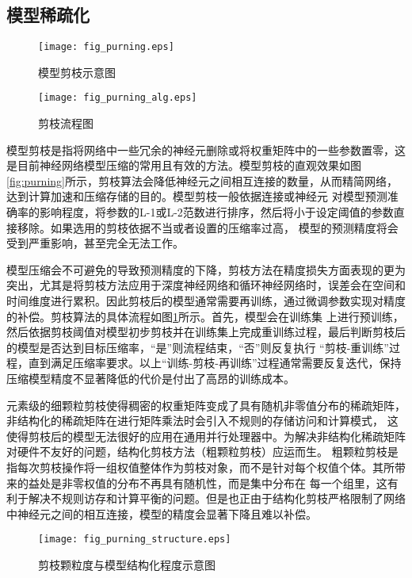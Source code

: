 \subsection{模型稀疏化}

\begin{figure}
	\centering
	\begin{minipage}[t]{0.48\textwidth}
		\centering
		\texttt{[image: fig\_purning.eps]}
		\caption{模型剪枝示意图}
		\label{fig:purning}
	\end{minipage}
	\begin{minipage}[t]{0.48\textwidth}
		\centering
		\texttt{[image: fig\_purning\_alg.eps]}
		\caption{剪枝流程图}
		\label{fig:purning_alg}
	\end{minipage}
\end{figure}
模型剪枝是指将网络中一些冗余的神经元删除或将权重矩阵中的一些参数置零，这是目前神经网络模型压缩的常用且有效的方法。模型剪枝的直观效果如图
\ref{fig:purning}所示，剪枝算法会降低神经元之间相互连接的数量，从而精简网络，达到计算加速和压缩存储的目的。模型剪枝一般依据连接或神经元
对模型预测准确率的影响程度，将参数的L-1或L-2范数进行排序，然后将小于设定阈值的参数直接移除。如果选用的剪枝依据不当或者设置的压缩率过高，
模型的预测精度将会受到严重影响，甚至完全无法工作。

模型压缩会不可避免的导致预测精度的下降，剪枝方法在精度损失方面表现的更为突出，尤其是将剪枝方法应用于深度神经网络和循环神经网络时，误差会在空间和
时间维度进行累积。因此剪枝后的模型通常需要再训练，通过微调参数实现对精度的补偿。剪枝算法的具体流程如图\ref{fig:purning_alg}所示。首先，模型会在训练集
上进行预训练，然后依据剪枝阈值对模型初步剪枝并在训练集上完成重训练过程，最后判断剪枝后的模型是否达到目标压缩率，“是”则流程结束，“否”则反复执行
“剪枝-重训练”过程，直到满足压缩率要求。以上“训练-剪枝-再训练”过程通常需要反复迭代，保持压缩模型精度不显著降低的代价是付出了高昂的训练成本。

元素级的细颗粒剪枝使得稠密的权重矩阵变成了具有随机非零值分布的稀疏矩阵，非结构化的稀疏矩阵在进行矩阵乘法时会引入不规则的存储访问和计算模式，
这使得剪枝后的模型无法很好的应用在通用并行处理器中。为解决非结构化稀疏矩阵对硬件不友好的问题，结构化剪枝方法（粗颗粒剪枝）应运而生。
粗颗粒剪枝是指每次剪枝操作将一组权值整体作为剪枝对象，而不是针对每个权值个体。其所带来的益处是非零权值的分布不再具有随机性，而是集中分布在
每一个组里，这有利于解决不规则访存和计算平衡的问题。但是也正由于结构化剪枝严格限制了网络中神经元之间的相互连接，模型的精度会显著下降且难以补偿。
\begin{figure}
	\centering
	\texttt{[image: fig\_purning\_structure.eps]}
	\caption{剪枝颗粒度与模型结构化程度示意图}
	\label{fig:struc_purn}
\end{figure}

